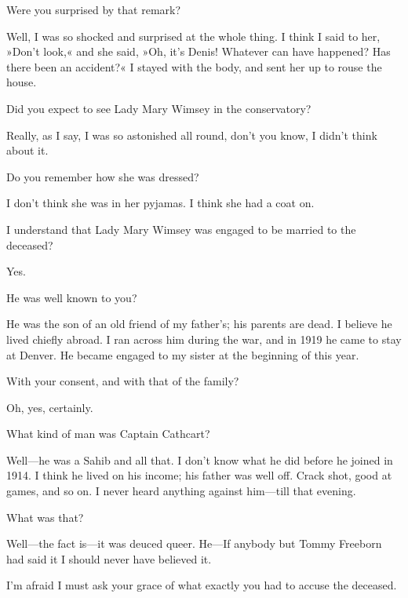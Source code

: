 \begin{dialogue}

 Were you surprised by that remark?

 Well, I was so shocked and surprised at the whole thing.  I think I said to her, »Don't look,« and she said, »Oh, it's Denis!  Whatever can have happened? Has there been an accident?« I stayed with the body, and sent her up to rouse the house.

 Did you expect to see Lady Mary Wimsey in the conservatory?

 Really, as I say, I was so astonished all round, don't you know, I didn't think about it.

 Do you remember how she was dressed?

 I don't think she was in her pyjamas.  I think she had a coat on.

 I understand that Lady Mary Wimsey was engaged to be married to the deceased?

 Yes.

 He was well known to you?

 He was the son of an old friend of my father's; his parents are dead. I believe he lived chiefly abroad. I ran across him during the war, and in 1919 he came to stay at Denver. He became engaged to my sister at the beginning of this year.

 With your consent, and with that of the family?

 Oh, yes, certainly.

 What kind of man was Captain Cathcart?

 Well\allowbreak---\allowbreak he was a Sahib and all that. I don't know what he did before he joined in 1914. I think he lived on his income; his father was well off. Crack shot, good at games, and so on. I never heard anything against him\allowbreak---\allowbreak till that evening.

 What was that?

 Well\allowbreak---\allowbreak the fact is\allowbreak---\allowbreak it was deuced queer. He\allowbreak---\allowbreak If anybody but Tommy Freeborn had said it I should never have believed it. 

 I'm afraid I must ask your grace of what exactly you had to accuse the deceased.


\end{dialogue}
